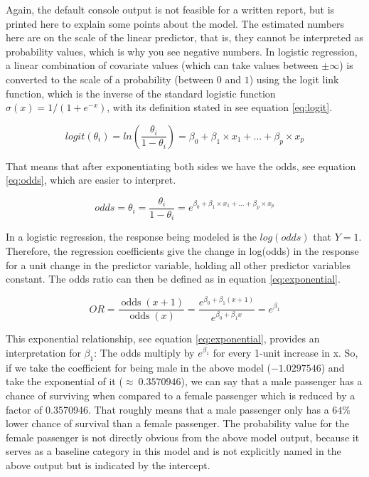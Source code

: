 \documentclass[
  11pt,
  a4paper,
  twoside]{scrbook}
\begin{document}
Again, the default console output is not feasible for a written report, but is printed here to explain some points about the model. The estimated numbers here are on the scale of the linear predictor, that is, they cannot be interpreted as probability values, which is why you see negative numbers. In logistic regression, a linear combination of covariate values (which can take values between \(\pm\infty\)) is converted to the scale of a probability (between \(0\) and \(1\)) using the logit link function, which is the inverse of the standard logistic function \(\sigma(x) = 1 / ( 1 + e^{-x})\), with its definition stated in see equation \eqref{eq:logit}.

\begin{equation} 
  logit(\theta_{i}) = ln(\frac{\theta_{i}}{1 - \theta_{i}}) = \beta_{0} + \beta_{1} \times x_{1} + ... + \beta_{p} \times x_{p}
  \label{eq:logit}
\end{equation}

That means that after exponentiating both sides we have the odds, see equation \eqref{eq:odds}, which are easier to interpret.

\begin{equation} 
  odds = \theta_{i} = \frac{\theta_{i}}{1 - \theta_{i}} = e^{\beta_{0} + \beta_{1} \times x_{1} + ... + \beta_{p} \times x_{p}}
  \label{eq:odds}
\end{equation}

In a logistic regression, the response being modeled is the \(log(odds)\) that \(Y = 1\). Therefore, the regression coefficients give the change in log(odds) in the response for a unit change in the predictor variable, holding all other predictor variables constant. The odds ratio can then be defined as in equation \eqref{eq:exponential}.

\begin{equation}
  OR ={\frac {\operatorname {odds} (x+1)}{\operatorname {odds} (x)}}={\frac {e^{\beta _{0}+\beta _{1}(x+1)}}{e^{\beta _{0}+\beta _{1}x}}}=e^{\beta _{1}}
  \label{eq:exponential}
\end{equation}

This exponential relationship, see equation \eqref{eq:exponential}, provides an interpretation for \(\beta_{1}\): The odds multiply by \(e^{\beta_{1}}\) for every 1-unit increase in x. So, if we take the coefficient for being male in the above model (\(-1.0297546\)) and take the exponential of it (\(\approx~0.3570946\)), we can say that a male passenger has a chance of surviving when compared to a female passenger which is reduced by a factor of 0.3570946. That roughly means that a male passenger only has a \(64\)\% lower chance of survival than a female passenger. The probability value for the female passenger is not directly obvious from the above model output, because it serves as a baseline category in this model and is not explicitly named in the above output but is indicated by the intercept.
\end{document}
